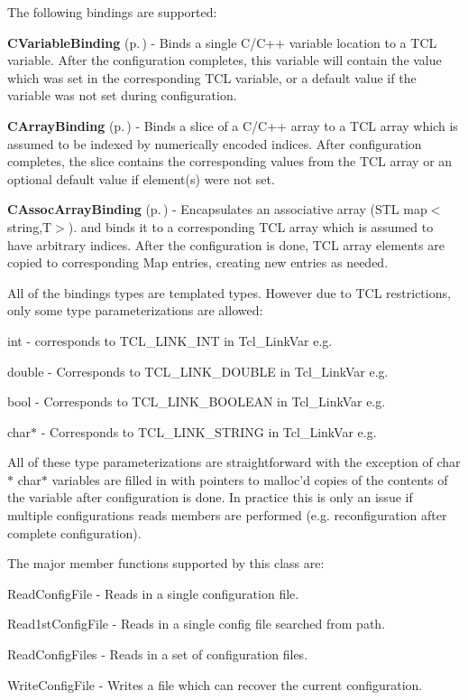 The following bindings are supported:\begin{CompactItemize}
\item 
{\bf CVariable\-Binding} {\rm (p.\,\pageref{classCVariableBinding})} - Binds a single C/C++ variable location to a TCL variable. After the configuration completes, this variable will contain the value which was set in the corresponding TCL variable, or a default value if the variable was not set during configuration.\item 
{\bf CArray\-Binding} {\rm (p.\,\pageref{classCArrayBinding})} - Binds a slice of a C/C++ array to a TCL array which is assumed to be indexed by numerically encoded indices. After configuration completes, the slice contains the corresponding values from the TCL array or an optional default value if element(s) were not set.\item 
{\bf CAssoc\-Array\-Binding} {\rm (p.\,\pageref{classCAssocArrayBinding})} - Encapsulates an associative array (STL map$<$string,T$>$). and binds it to a corresponding TCL array which is assumed to have arbitrary indices. After the configuration is done, TCL array elements are copied to corresponding Map entries, creating new entries as needed.\end{CompactItemize}
All of the bindings types are templated types. However due to TCL  restrictions, only some type parameterizations are allowed:\begin{CompactItemize}
\item 
int - corresponds to TCL\_\-LINK\_\-INT in Tcl\_\-Link\-Var e.g.\item 
double - Corresponds to TCL\_\-LINK\_\-DOUBLE in Tcl\_\-Link\-Var e.g.\item 
bool - Corresponds to TCL\_\-LINK\_\-BOOLEAN in Tcl\_\-Link\-Var e.g.\item 
char$\ast$ - Corresponds to TCL\_\-LINK\_\-STRING in Tcl\_\-Link\-Var e.g.\end{CompactItemize}
All of these type parameterizations are straightforward with the exception of char$\ast$ char$\ast$ variables are filled in with pointers to malloc'd copies of the contents of the variable after configuration is done. In practice this is only an issue if multiple configurations reads members are performed (e.g. reconfiguration after complete configuration).

The major member functions supported by this class are:\begin{CompactItemize}
\item 
Read\-Config\-File - Reads in a single configuration file.\item 
Read1st\-Config\-File - Reads in a single config file searched from path.\item 
Read\-Config\-Files - Reads in a set of configuration files.\item 
Write\-Config\-File - Writes a file which can recover the current  configuration. \end{CompactItemize}




